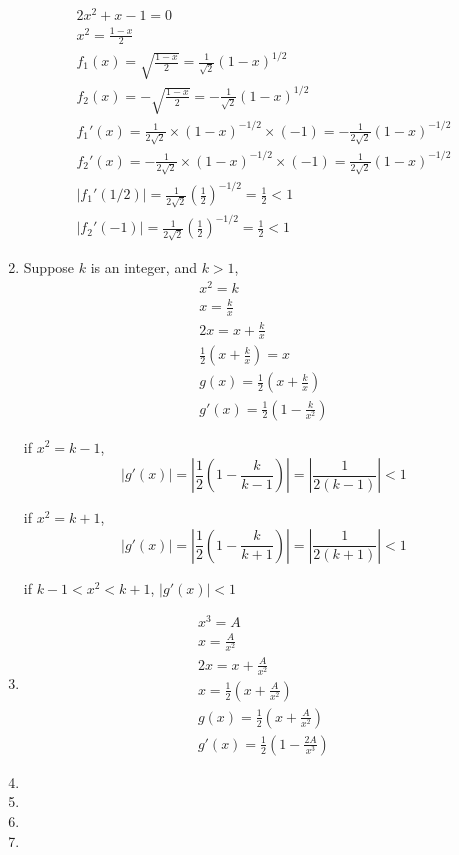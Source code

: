 \documentclass[UTF8]{ctexart}
\begin{document}
\begin{enumerate}
\begin{gather*}
	2x^2 + x - 1 = 0\\
	x^2 = \frac{1 - x}{2} \\
	f_1(x) = \sqrt{\frac{1 - x}{2}} = \frac{1}{\sqrt{2}}(1 - x)^{1/2} \\
	f_2(x) = -\sqrt{\frac{1 - x}{2}} = -\frac{1}{\sqrt{2}}(1 - x)^{1/2} \\
	f_1'(x) = \frac{1}{2\sqrt{2}} \times (1 - x)^{-1/2} \times (-1) = -\frac{1}{2\sqrt{2}} (1 - x)^{-1/2} \\
	f_2'(x) = -\frac{1}{2\sqrt{2}} \times (1 - x)^{-1/2} \times (-1) = \frac{1}{2\sqrt{2}} (1 - x)^{-1/2} \\
	|f_1'(1/2)| = \frac{1}{2\sqrt{2}} (\frac{1}{2})^{-1/2} = \frac{1}{2} < 1\\
	|f_2'(-1)| = \frac{1}{2\sqrt{2}} (\frac{1}{2})^{-1/2} = \frac{1}{2} < 1
\end{gather*}

\item Suppose $k$ is an integer, and $k > 1$,
\begin{gather*}
	x^2 = k \\
	x = \frac{k}{x} \\
	2x = x + \frac{k}{x} \\
	\frac{1}{2}(x + \frac{k}{x}) = x \\
	g(x) = \frac{1}{2}(x + \frac{k}{x}) \\
	g'(x) = \frac{1}{2}(1 - \frac{k}{x^2})
\end{gather*}

if $x^2 = k - 1$, 
\[
	|g'(x)| = |\frac{1}{2}(1 - \frac{k}{k - 1})| = |\frac{1}{2(k-1)}| < 1
\]

if $x^2 = k + 1$,
\[
	|g'(x)| = |\frac{1}{2}(1 - \frac{k}{k + 1})| = |\frac{1}{2(k+1)}| < 1
\]

if $k-1 < x^2 < k+1$, $|g'(x)| < 1$

\item 
\begin{gather*}
x^3 = A \\
x = \frac{A}{x^2} \\
2x = x + \frac{A}{x^2} \\
x = \frac{1}{2}(x + \frac{A}{x^2}) \\
g(x) = \frac{1}{2}(x + \frac{A}{x^2}) \\
g'(x) = \frac{1}{2}(1 - \frac{2A}{x^3})
\end{gather*}

\item

\item

\item

\item

\end{enumerate}
\end{document}
